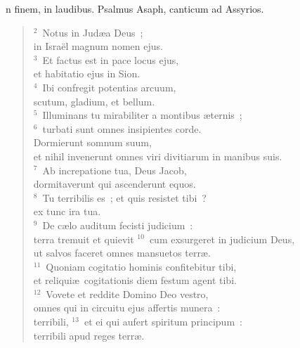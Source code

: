 \bchapter
{}n finem, in laudibus. Psalmus Asaph, canticum ad Assyrios.
\begin{flushleft}\begin{verse}\vspace{6pt}${}^{2}$~Notus in Jud\ae a Deus~;\\ in Isra\"el magnum nomen ejus.\\
${}^{3}$~Et factus est in pace locus ejus,\\ et habitatio ejus in Sion.\\
${}^{4}$~Ibi confregit potentias arcuum,\\ scutum, gladium, et bellum.\\
${}^{5}$~Illuminans tu mirabiliter a montibus \ae ternis~;\\
${}^{6}$~turbati sunt omnes insipientes corde.\\ Dormierunt somnum suum,\\ et nihil invenerunt omnes viri divitiarum in manibus suis.\\
${}^{7}$~Ab increpatione tua, Deus Jacob,\\ dormitaverunt qui ascenderunt equos.\\
${}^{8}$~Tu terribilis es~; et quis resistet tibi~?\\ ex tunc ira tua.\\
${}^{9}$~De c\ae lo auditum fecisti judicium~:\\ terra tremuit et quievit
${}^{10}$~cum exsurgeret in judicium Deus,\\ ut salvos faceret omnes mansuetos terr\ae .\\
${}^{11}$~Quoniam cogitatio hominis confitebitur tibi,\\ et reliqui\ae\ cogitationis diem festum agent tibi.\\
${}^{12}$~Vovete et reddite Domino Deo vestro,\\ omnes qui in circuitu ejus affertis munera~:\\ terribili,
${}^{13}$~et ei qui aufert spiritum principum~:\\ terribili apud reges terr\ae .\end{verse}\end{flushleft}



